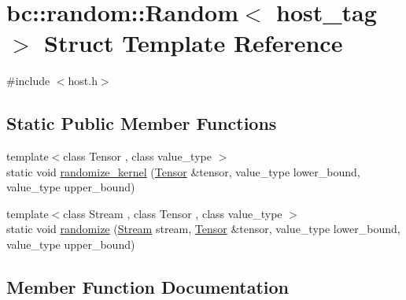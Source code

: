 \hypertarget{structbc_1_1random_1_1Random_3_01host__tag_01_4}{}\section{bc\+:\+:random\+:\+:Random$<$ host\+\_\+tag $>$ Struct Template Reference}
\label{structbc_1_1random_1_1Random_3_01host__tag_01_4}


{\ttfamily \#include $<$host.\+h$>$}

\subsection*{Static Public Member Functions}
\begin{DoxyCompactItemize}
\item 
{\footnotesize template$<$class Tensor , class value\+\_\+type $>$ }\\static void \hyperlink{structbc_1_1random_1_1Random_3_01host__tag_01_4_a889a0e830af5dbe593a65c012829ade0}{randomize\+\_\+kernel} (\hyperlink{namespacebc_a659391e47ab612be3ba6c18cf9c89159}{Tensor} \&tensor, value\+\_\+type lower\+\_\+bound, value\+\_\+type upper\+\_\+bound)
\item 
{\footnotesize template$<$class Stream , class Tensor , class value\+\_\+type $>$ }\\static void \hyperlink{structbc_1_1random_1_1Random_3_01host__tag_01_4_a6f1adf8d711f6c9dc0b4e0847abd8204}{randomize} (\hyperlink{classbc_1_1streams_1_1Stream}{Stream} stream, \hyperlink{namespacebc_a659391e47ab612be3ba6c18cf9c89159}{Tensor} \&tensor, value\+\_\+type lower\+\_\+bound, value\+\_\+type upper\+\_\+bound)
\end{DoxyCompactItemize}


\subsection{Member Function Documentation}
\mbox{\label{structbc_1_1random_1_1Random_3_01host__tag_01_4_a6f1adf8d711f6c9dc0b4e0847abd8204}} 

